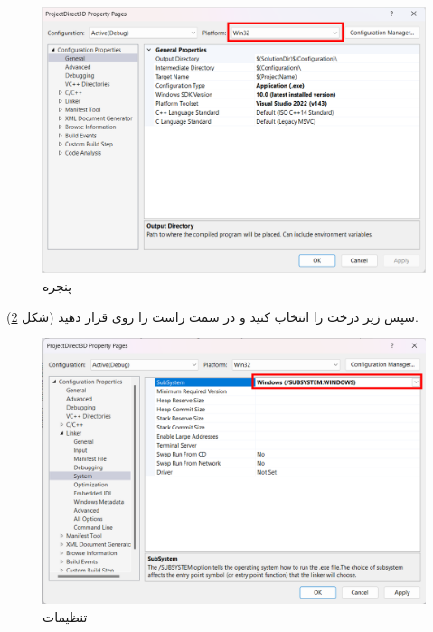 {\begin{spacing}{1.5}
        \begin{figure}[H]
            \centering
            \setlength{\belowcaptionskip}{-10pt}
            \includegraphics[width=\textwidth]{Images/3/3.Intro.5.6}
            \caption{پنجره }
            \label{fig:3.Intro.5.6}
        \end{figure}

        سپس زیر درخت  را انتخاب کنید و در سمت راست  را روی  قرار دهید (شکل \ref{fig:3.Intro.5.7}).

        \begin{figure}[H]
            \centering
            \setlength{\belowcaptionskip}{-10pt}
            \includegraphics[scale=0.7]{Images/3/3.Intro.5.7}
            \caption{تنظیمات }
            \label{fig:3.Intro.5.7}
        \end{figure}
    \end{spacing}
}

